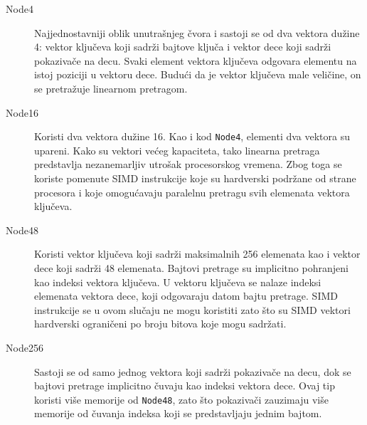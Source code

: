 \documentclass[12pt,oneside]{memoir}
\begin{document}
\begin{description}

  \item[Node4] Najjednostavniji oblik unutrašnjeg čvora
        i sastoji se od
        dva vektora dužine 4: vektor ključeva koji sadrži bajtove ključa i
        vektor dece koji sadrži pokazivače na decu. Svaki element vektora
        ključeva odgovara elementu na istoj poziciji u vektoru dece.
        Budući da je vektor ključeva male veličine, on se pretražuje
        linearnom pretragom.
  \item[Node16] Koristi dva vektora dužine 16.
        Kao i kod \texttt{Node4}, elementi dva vektora su upareni.
        Kako su vektori većeg kapaciteta, tako linearna
        pretraga predstavlja nezanemarljiv utrošak procesorskog
        vremena. Zbog toga se koriste pomenute SIMD instrukcije koje su
        hardverski podržane od strane procesora i koje
        omogućavaju paralelnu pretragu svih elemenata vektora ključeva.
  \item[Node48]
        Koristi vektor ključeva koji sadrži maksimalnih 256 elemenata
        kao i vektor dece koji sadrži 48 elemenata.
        Bajtovi pretrage su implicitno pohranjeni kao indeksi
        vektora ključeva. U vektoru ključeva se nalaze indeksi elemenata
        vektora dece, koji odgovaraju datom bajtu pretrage.
        SIMD instrukcije se u ovom slučaju ne mogu koristiti zato što su
        SIMD vektori hardverski ograničeni po broju bitova koje mogu sadržati.
  \item[Node256] Sastoji se od samo jednog vektora koji sadrži pokazivače na decu,
        dok se bajtovi pretrage implicitno čuvaju kao indeksi vektora
        dece. Ovaj tip koristi više memorije od \texttt{Node48},
        zato što pokazivači zauzimaju više memorije od čuvanja indeksa
        koji se predstavljaju jednim bajtom.
\end{description}
\end{document}
